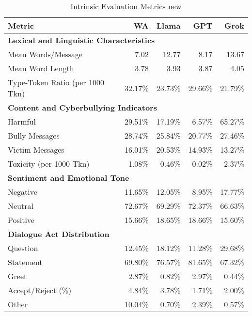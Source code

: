 \begin{table*}[ht]
\centering
\setlength{\tabcolsep}{3pt} %
\renewcommand{\arraystretch}{0.85} %
\begin{tabular}{l@{\hskip 4pt}r@{\hskip 4pt}r@{\hskip 4pt}r@{\hskip 4pt}r}
\hline
\textbf{Metric} & \textbf{WA} & \textbf{Llama} & \textbf{GPT} & \textbf{Grok} \\
\hline
\multicolumn{5}{l}{\textbf{Lexical and Linguistic Characteristics}} \\
Mean Words/Message & 7.02 & 12.77 & 8.17 & 13.67 \\
Mean Word Length & 3.78 & 3.93 & 3.87 & 4.05 \\
Type-Token Ratio (per 1000 Tkn) & 32.17\% & 23.73\% & 29.66\% & 21.79\% \\
\hline
\multicolumn{5}{l}{\textbf{Content and Cyberbullying Indicators}} \\
Harmful  & 29.51\% & 17.19\% & 6.57\% & 65.27\% \\
Bully Messages & 28.74\% & 25.84\% & 20.77\% & 27.46\% \\
Victim Messages  & 16.01\% & 20.53\% & 14.93\% & 13.27\% \\
Toxicity (per 1000 Tkn) & 1.08\% & 0.46\% & 0.02\% & 2.37\% \\
\hline
\multicolumn{5}{l}{\textbf{Sentiment and Emotional Tone}} \\
Negative & 11.65\% & 12.05\% & 8.95\% & 17.77\% \\
Neutral & 72.67\% & 69.29\% & 72.37\% & 66.63\% \\
Positive & 15.66\% & 18.65\% & 18.66\% & 15.60\% \\
\hline
\multicolumn{5}{l}{\textbf{Dialogue Act Distribution}} \\
Question & 12.45\% & 18.12\% & 11.28\% & 29.68\% \\
Statement & 69.80\% & 76.57\% & 81.65\% & 67.32\% \\
Greet & 2.87\% & 0.82\% & 2.97\% & 0.44\% \\
Accept/Reject (\%) & 4.84\% & 3.78\% & 1.71\% & 2.00\% \\
Other & 10.04\% & 0.70\% & 2.39\% & 0.57\% \\
\hline
\end{tabular}
\caption{Intrinsic Evaluation Metrics new}
\label{t:intrinsic-metrics-merged}
\end{table*}
